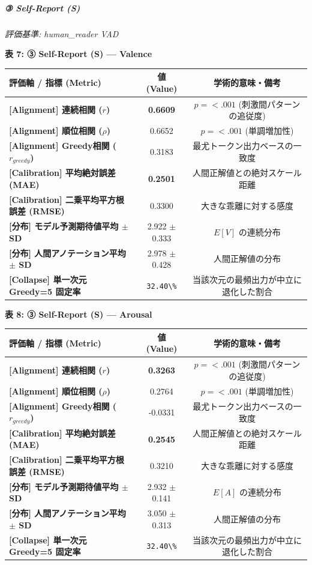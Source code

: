 \subparagraph{③ Self-Report (S)}
\textit{評価基準: human\_reader VAD}

\textbf{表 7: ③ Self-Report (S) — Valence}
\begin{center}
\small
\begin{tabular}{lcc}
\toprule
\textbf{評価軸 / 指標 (Metric)} & \textbf{値 (Value)} & \textbf{学術的意味・備考} \\
\midrule
\textbf{[Alignment] 連続相関 ($r$)} & \textbf{0.6609} & $p = <.001 $ (刺激間パターンの追従度) \\
\textbf{[Alignment] 順位相関 ($\rho$)} & 0.6652 & $p = <.001 $ (単調増加性) \\
\textbf{[Alignment] Greedy相関 ($r_{greedy}$)} & 0.3183 & 最尤トークン出力ベースの一致度 \\
\textbf{[Calibration] 平均絶対誤差 (MAE)} & \textbf{0.2501} & 人間正解値との絶対スケール距離 \\
\textbf{[Calibration] 二乗平均平方根誤差 (RMSE)} & 0.3300 & 大きな乖離に対する感度 \\
\textbf{[分布] モデル予測期待値平均 $\pm$ SD} & 2.922 $\pm$ 0.333 & $E[V]$ の連続分布 \\
\textbf{[分布] 人間アノテーション平均 $\pm$ SD} & 2.978 $\pm$ 0.428 & 人間正解値の分布 \\
\textbf{[Collapse] 単一次元 Greedy=5 固定率} & \texttt{32.40\textbackslash{}\%} & 当該次元の最頻出力が中立に退化した割合 \\
\bottomrule
\end{tabular}
\end{center}


\textbf{表 8: ③ Self-Report (S) — Arousal}
\begin{center}
\small
\begin{tabular}{lcc}
\toprule
\textbf{評価軸 / 指標 (Metric)} & \textbf{値 (Value)} & \textbf{学術的意味・備考} \\
\midrule
\textbf{[Alignment] 連続相関 ($r$)} & \textbf{0.3263} & $p = <.001 $ (刺激間パターンの追従度) \\
\textbf{[Alignment] 順位相関 ($\rho$)} & 0.2764 & $p = <.001 $ (単調増加性) \\
\textbf{[Alignment] Greedy相関 ($r_{greedy}$)} & -0.0331 & 最尤トークン出力ベースの一致度 \\
\textbf{[Calibration] 平均絶対誤差 (MAE)} & \textbf{0.2545} & 人間正解値との絶対スケール距離 \\
\textbf{[Calibration] 二乗平均平方根誤差 (RMSE)} & 0.3210 & 大きな乖離に対する感度 \\
\textbf{[分布] モデル予測期待値平均 $\pm$ SD} & 2.932 $\pm$ 0.141 & $E[A]$ の連続分布 \\
\textbf{[分布] 人間アノテーション平均 $\pm$ SD} & 3.050 $\pm$ 0.313 & 人間正解値の分布 \\
\textbf{[Collapse] 単一次元 Greedy=5 固定率} & \texttt{32.40\textbackslash{}\%} & 当該次元の最頻出力が中立に退化した割合 \\
\bottomrule
\end{tabular}
\end{center}


